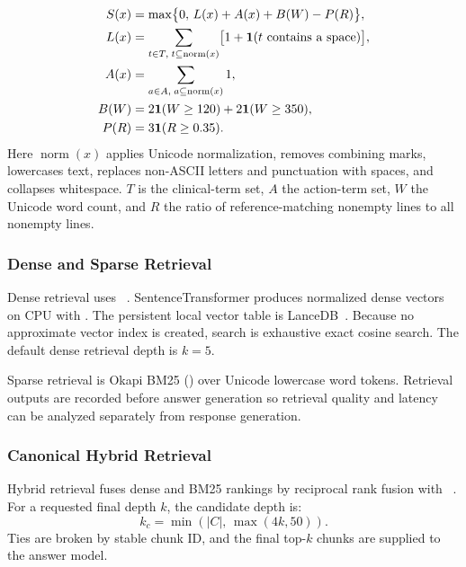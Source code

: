 \begin{align}
S(x) &= \max\bigl\{0,\, L(x) + A(x) + B(W) - P(R)\bigr\},\\
L(x) &= \sum_{t \in T,\; t \subseteq \operatorname{norm}(x)}
        \bigl[1 + \mathbf{1}(t \text{ contains a space})\bigr],\notag\\
A(x) &= \sum_{a \in A,\; a \subseteq \operatorname{norm}(x)} 1,\notag\\
B(W) &= 2\mathbf{1}(W \geq 120) + 2\mathbf{1}(W \geq 350),\notag\\
P(R) &= 3\mathbf{1}(R \geq 0.35).\notag
\end{align}
Here $\operatorname{norm}(x)$ applies Unicode normalization, removes
combining marks, lowercases text, replaces non-ASCII letters and
punctuation with spaces, and collapses whitespace. $T$ is the
clinical-term set, $A$ the action-term set, $W$ the Unicode word count, and
$R$ the ratio of reference-matching nonempty lines to all nonempty lines.

\subsubsection{Dense and Sparse Retrieval}
Dense retrieval uses ~\cite{chen2024bge}.
SentenceTransformer produces normalized dense vectors on CPU with
. The persistent local vector table is
LanceDB~\cite{lancedb2026vector}.
Because no approximate vector index is created, search is exhaustive exact
cosine search. The default dense retrieval depth is $k = 5$.

Sparse retrieval is Okapi BM25 () over Unicode
lowercase word tokens. Retrieval outputs are recorded before answer
generation so retrieval quality and latency can be analyzed separately from
response generation.

\subsubsection{Canonical Hybrid Retrieval}
Hybrid retrieval fuses dense and BM25 rankings by reciprocal rank fusion
with ~\cite{cormack2009reciprocal}. For a requested
final depth $k$, the candidate depth is:
\begin{equation}
\label{eq:candidate-depth}
k_c = \min(\lvert C \rvert,\, \max(4k, 50)).
\end{equation}
Ties are broken by stable chunk ID, and the final top-$k$ chunks are
supplied to the answer model.

